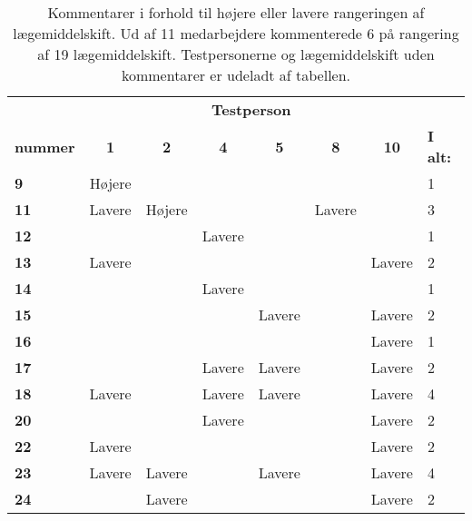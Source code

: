 \begin{table}[H]
\caption{Kommentarer i forhold til højere eller lavere rangeringen af lægemiddelskift. Ud af 11 medarbejdere kommenterede 6 på rangering af 19 lægemiddelskift. Testpersonerne og lægemiddelskift uden kommentarer er udeladt af tabellen.}
\vspace{2mm}
\label{table:resultat3}
\centering
\begin{tabular}{l|c|c|c|c|c|c|p{2cm}}
\rowcolor[HTML]{C0C0C0}{\textbf{Lægemiddel}}& \multicolumn{6}{c}{\textbf{Testperson}} &  \\
\rowcolor[HTML]{C0C0C0}\textbf{nummer}& \textbf{1} & \textbf{2} & \textbf{4} & \textbf{5} & \textbf{8} & \textbf{10}  & \textbf{I alt:}\\ \hline
\cellcolor[HTML]{C0C0C0}\textbf{9} & Højere & & & & &  & \cellcolor[HTML]{EFEFEF} 1 \\ \hline
\cellcolor[HTML]{C0C0C0}\textbf{11} & Lavere & Højere & & & Lavere &  & \cellcolor[HTML]{EFEFEF}3 \\\hline
\cellcolor[HTML]{C0C0C0}\textbf{12} & & & Lavere & & & & \cellcolor[HTML]{EFEFEF}1 \\\hline
\cellcolor[HTML]{C0C0C0}\textbf{13}& Lavere  & & & & & Lavere  & \cellcolor[HTML]{EFEFEF}2  \\ \hline
\cellcolor[HTML]{C0C0C0}\textbf{14} &  & & Lavere  & & &  & \cellcolor[HTML]{EFEFEF}1 \\ \hline
\cellcolor[HTML]{C0C0C0}\textbf{15} & & & & Lavere & & Lavere  & \cellcolor[HTML]{EFEFEF}2 \\\hline
\cellcolor[HTML]{C0C0C0}\textbf{16} & & & &  & & Lavere & \cellcolor[HTML]{EFEFEF}1 \\\hline
\cellcolor[HTML]{C0C0C0}\textbf{17}& & & Lavere & Lavere & & Lavere & \cellcolor[HTML]{EFEFEF}2 \\\hline
\cellcolor[HTML]{C0C0C0}\textbf{18} & Lavere & & Lavere & Lavere & & Lavere & \cellcolor[HTML]{EFEFEF}4 \\\hline
\cellcolor[HTML]{C0C0C0}\textbf{20} & & & Lavere &  & & Lavere & \cellcolor[HTML]{EFEFEF}2 \\\hline
\cellcolor[HTML]{C0C0C0}\textbf{22} & Lavere & &  &  & & Lavere & \cellcolor[HTML]{EFEFEF} 2\\\hline
\cellcolor[HTML]{C0C0C0}\textbf{23} & Lavere & Lavere & & Lavere & & Lavere  & \cellcolor[HTML]{EFEFEF} 4\\ \hline
\cellcolor[HTML]{C0C0C0}\textbf{24} & & Lavere & & & & Lavere & \cellcolor[HTML]{EFEFEF} 2 \\\hline

\end{tabular}
\end{table}

